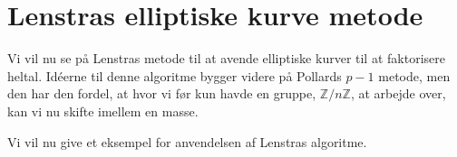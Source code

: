 \section{Lenstras elliptiske kurve metode}

Vi vil nu se på Lenstras metode til at avende
elliptiske kurver til at faktorisere heltal. 
Idéerne til denne algoritme bygger videre på
Pollards $p-1$ metode, men den har den fordel, at 
hvor vi før kun havde en gruppe, $\mathbb{Z} / n \mathbb{Z}$,
at arbejde over, kan vi nu skifte imellem en masse.


\begin{example}
Vi vil nu give et eksempel for anvendelsen af Lenstras algoritme.
\end{example}